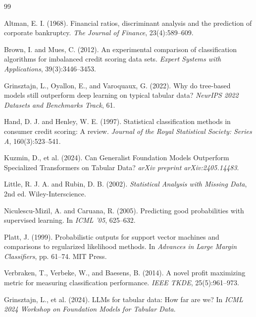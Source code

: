 \documentclass[11pt, a4paper]{article}
\begin{document}
\newpage

\begin{thebibliography}{99}

Altman, E. I. (1968).
\newblock Financial ratios, discriminant analysis and the prediction of corporate bankruptcy.
\newblock \emph{The Journal of Finance}, 23(4):589--609.

Brown, I. and Mues, C. (2012).
\newblock An experimental comparison of classification algorithms for imbalanced credit scoring data sets.
\newblock \emph{Expert Systems with Applications}, 39(3):3446--3453.

Grinsztajn, L., Oyallon, E., and Varoquaux, G. (2022).
\newblock Why do tree-based models still outperform deep learning on typical tabular data?
\newblock \emph{NeurIPS 2022 Datasets and Benchmarks Track}, 61.

Hand, D. J. and Henley, W. E. (1997).
\newblock Statistical classification methods in consumer credit scoring: A review.
\newblock \emph{Journal of the Royal Statistical Society: Series A}, 160(3):523--541.

Kuzmin, D., et al. (2024).
\newblock Can Generalist Foundation Models Outperform Specialized Transformers on Tabular Data?
\newblock \emph{arXiv preprint arXiv:2405.14483}.

Little, R. J. A. and Rubin, D. B. (2002).
\newblock \emph{Statistical Analysis with Missing Data}, 2nd ed.
\newblock Wiley-Interscience.

Niculescu-Mizil, A. and Caruana, R. (2005).
\newblock Predicting good probabilities with supervised learning.
\newblock In \emph{ICML '05}, 625--632.

Platt, J. (1999).
\newblock Probabilistic outputs for support vector machines and comparisons to regularized likelihood methods.
\newblock In \emph{Advances in Large Margin Classifiers}, pp. 61--74. MIT Press.

Verbraken, T., Verbeke, W., and Baesens, B. (2014).
\newblock A novel profit maximizing metric for measuring classification performance.
\newblock \emph{IEEE TKDE}, 25(5):961--973.

Grinsztajn, L., et al. (2024).
\newblock LLMs for tabular data: How far are we?
\newblock In \emph{ICML 2024 Workshop on Foundation Models for Tabular Data}.

\end{thebibliography}
\end{document}
